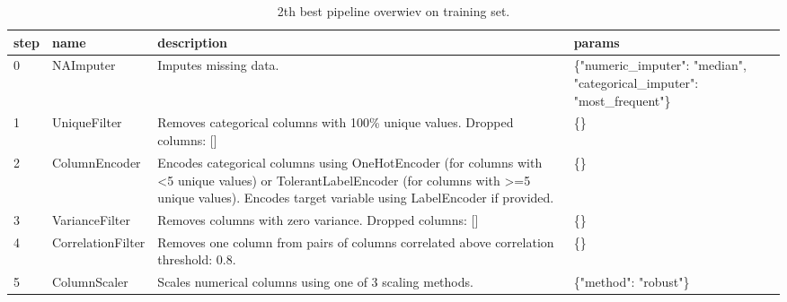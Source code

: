 \documentclass{article}%
\begin{document}
%


\begin{table}[H]%
\begin{center}%
\begin{tabular}{p{10mm} p{30mm} p{60mm} p{60mm}}%
\hline%
\textbf{step}&\textbf{name}&\textbf{description}&\textbf{params}\\%
\hline%
0&NAImputer&Imputes missing data.&\{"numeric\_imputer": "median", "categorical\_imputer": "most\_frequent"\}\\%
1&UniqueFilter&Removes categorical columns with 100\% unique values. Dropped columns: {[}{]}&\{\}\\%
2&ColumnEncoder&Encodes categorical columns using OneHotEncoder (for columns with <5 unique values) or TolerantLabelEncoder (for columns with >=5 unique values). Encodes target variable using LabelEncoder if provided.&\{\}\\%
3&VarianceFilter&Removes columns with zero variance. Dropped columns: {[}{]}&\{\}\\%
4&CorrelationFilter&Removes one column from pairs of columns correlated above correlation threshold: 0.8.&\{\}\\%
5&ColumnScaler&Scales numerical columns using one of 3 scaling methods.&\{"method": "robust"\}\\%
\hline%
\end{tabular}%
\end{center}%
\caption{2th best pipeline overwiev on training set.}%
\end{table}

%
\end{document}
